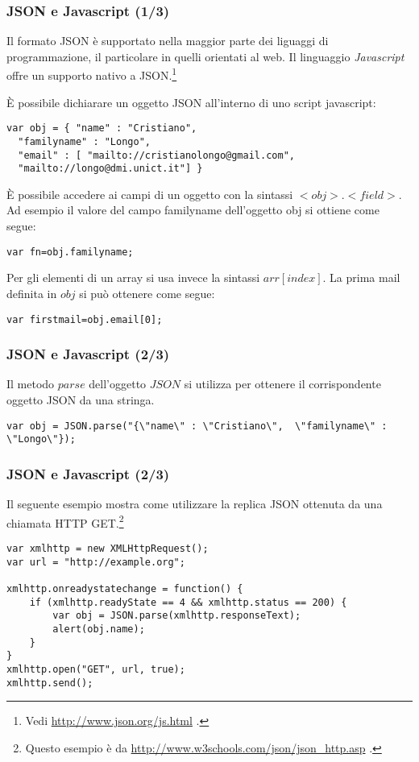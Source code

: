 \documentclass[8pt]{beamer}
\begin{document}
\begin{frame}[fragile]
 \frametitle{JSON e Javascript (1/3)}
 Il formato JSON \`e supportato nella maggior parte dei liguaggi di programmazione,
 il particolare in quelli orientati al web. Il linguaggio \emph{Javascript} offre 
 un supporto nativo a JSON.\footnote{Vedi \url{http://www.json.org/js.html} .}
 \vspace{\baselineskip}
 
\`E possibile dichiarare un oggetto JSON all'interno di uno script javascript:
\begin{verbatim}
var obj = { "name" : "Cristiano",
  "familyname" : "Longo",
  "email" : [ "mailto://cristianolongo@gmail.com", 
  "mailto://longo@dmi.unict.it"] }
\end{verbatim}

\`E possibile accedere ai campi di un oggetto con la sintassi $<obj>.<field>$.
Ad esempio il valore del campo familyname dell'oggetto obj si ottiene 
come segue:
\begin{verbatim}
var fn=obj.familyname;
\end{verbatim}

Per gli elementi di un array si usa invece la sintassi $arr[index]$. La
prima mail definita in $obj$ si pu\`o ottenere come segue:

\begin{verbatim}
var firstmail=obj.email[0];
\end{verbatim}
\end{frame}

\begin{frame}[fragile]
 \frametitle{JSON e Javascript (2/3)}
 
 Il metodo $parse$ dell'oggetto $JSON$ si utilizza per ottenere
 il corrispondente oggetto JSON da una stringa.
\begin{verbatim}
var obj = JSON.parse("{\"name\" : \"Cristiano\",  \"familyname\" : \"Longo\"});
\end{verbatim}
\end{frame}

\begin{frame}[fragile]
 \frametitle{JSON e Javascript (2/3)}
 
Il seguente esempio mostra come utilizzare la replica JSON ottenuta da 
una chiamata HTTP GET.\footnote{Questo esempio \`e da \url{http://www.w3schools.com/json/json_http.asp} .}
\begin{verbatim}
var xmlhttp = new XMLHttpRequest();
var url = "http://example.org";

xmlhttp.onreadystatechange = function() {
    if (xmlhttp.readyState == 4 && xmlhttp.status == 200) {
        var obj = JSON.parse(xmlhttp.responseText);
        alert(obj.name);
    }
}
xmlhttp.open("GET", url, true);
xmlhttp.send();
\end{verbatim}
\end{frame}
\end{document}
